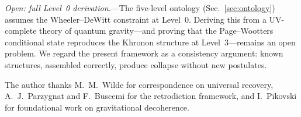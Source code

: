 \documentclass[prl,twocolumn,superscriptaddress,longbibliography,floatfix]{revtex4-2}
\begin{document}
\emph{Open: full Level~0 derivation.}---The five-level ontology
(Sec.~\ref{sec:ontology}) assumes the Wheeler--DeWitt constraint at
Level~0.  Deriving this from a UV-complete theory of quantum
gravity---and proving that the Page--Wootters conditional state
reproduces the Khronon structure at Level~3---remains an open
problem.  We regard the present framework as a consistency argument:
known structures, assembled correctly, produce collapse without new
postulates.

\begin{acknowledgments}
The author thanks M.~M.~Wilde for correspondence on universal
recovery, A.~J.~Parzygnat and F.~Buscemi for the retrodiction
framework, and I.~Pikovski for foundational work on gravitational
decoherence.
\end{acknowledgments}

\end{document}
